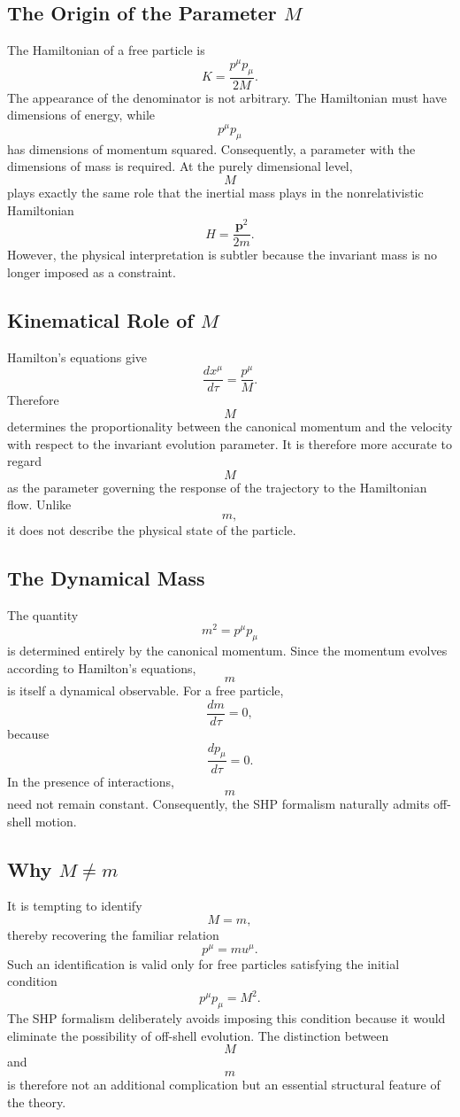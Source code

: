 \subsection{The Origin of the Parameter \(M\)}
The Hamiltonian of a free particle is
\[K=\frac{p^\mu p_\mu}{2M}.\]
The appearance of the denominator is not arbitrary.
The Hamiltonian must have dimensions of energy, while
\[p^\mu p_\mu\]
has dimensions of momentum squared.
Consequently, a parameter with the dimensions of mass is required.
At the purely dimensional level,
\[M\]
plays exactly the same role that the inertial mass plays in the
nonrelativistic Hamiltonian
\[H=\frac{\mathbf p^2}{2m}.\]
However, the physical interpretation is subtler because the invariant
mass is no longer imposed as a constraint.
\subsection{Kinematical Role of \(M\)}
Hamilton's equations give
\[\frac{dx^\mu}{d\tau}=\frac{p^\mu}{M}.\]
Therefore
\[M\]
determines the proportionality between the canonical momentum and the
velocity with respect to the invariant evolution parameter.
It is therefore more accurate to regard
\[M\]
as the parameter governing the response of the trajectory to the
Hamiltonian flow.
Unlike
\[m,\]
it does not describe the physical state of the particle.
\subsection{The Dynamical Mass}
The quantity
\[m^2=p^\mu p_\mu\]
is determined entirely by the canonical momentum.
Since the momentum evolves according to Hamilton's equations,
\[m\]
is itself a dynamical observable.
For a free particle,
\[\frac{dm}{d\tau}=0,\]
because
\[\frac{dp_\mu}{d\tau}=0.\]
In the presence of interactions,
\[m\]
need not remain constant.
Consequently, the SHP formalism naturally admits off-shell motion.
\subsection{Why \(M\neq m\)}
It is tempting to identify
\[M=m,\]
thereby recovering the familiar relation
\[p^\mu=m u^\mu.\]
Such an identification is valid only for free particles satisfying the
initial condition
\[p^\mu p_\mu=M^2.\]
The SHP formalism deliberately avoids imposing this condition because it
would eliminate the possibility of off-shell evolution.
The distinction between
\[M\]
and
\[m\]
is therefore not an additional complication but an essential structural
feature of the theory.
